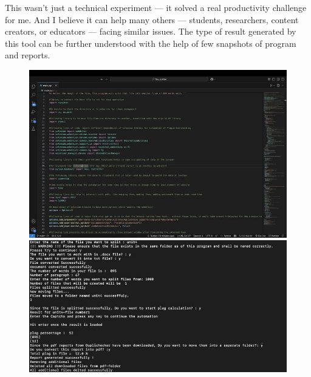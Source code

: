 \documentclass{report}
\begin{document}
\par This wasn’t just a technical experiment — it solved a real productivity challenge for me. And I believe it can help many others — students, researchers, content creators, or educators — facing similar issues. The type of result generated by this tool can be further understood with the help of few snapshots of program and reports.
\begin{figure}[h]
    \centering
    \begin{minipage}{0.49\textwidth}
        \centering
        \includegraphics[width=1\linewidth]{Python project/code1.jpeg}
    \end{minipage}
    \begin{minipage}{0.49\textwidth}
        \centering
        \includegraphics[width=1\linewidth]{Python project/code2.jpeg}  
    \end{minipage}
\end{figure}
\end{document}
